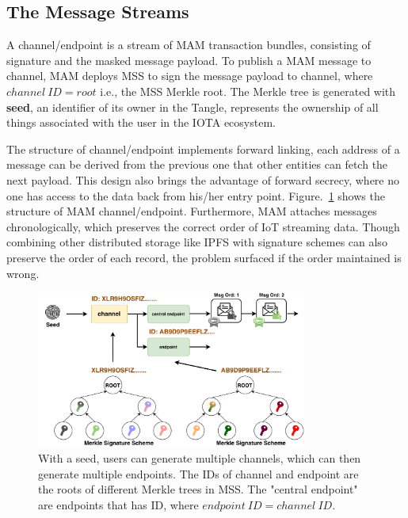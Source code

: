\documentclass[conference]{IEEEtran}
\begin{document}
\subsection{The Message Streams}
\label{section:mam_streams}
A channel/endpoint is a stream of MAM transaction bundles, consisting of signature and the masked message payload. To publish a MAM message to channel, MAM deploys MSS to sign the message payload to channel, where $channel\ ID = root$ i.e., the MSS Merkle root. The Merkle tree is generated with \textbf{seed}, an identifier of its owner in the Tangle, represents the ownership of all things associated with the user in the IOTA ecosystem.

The structure of channel/endpoint implements forward linking, each address of a message can be derived from the previous one that other entities can fetch the next payload. This design also brings the advantage of forward secrecy, where no one has access to the data back from his/her entry point. Figure.~\ref{fig:mam_structure} shows the structure of MAM channel/endpoint. Furthermore, MAM attaches messages chronologically, which preserves the correct order of IoT streaming data. Though combining other distributed storage like IPFS\cite{IPFS} with signature schemes can also preserve the order of each record, the problem surfaced if the order maintained is wrong.

\begin{figure}[h]
    \centering
    \includegraphics[width=3.5in]{mam_structure}
    \caption{With a seed, users can generate multiple channels, which can then generate multiple endpoints. The IDs of channel and endpoint are the roots of different Merkle trees in MSS. The "central endpoint" are endpoints that has ID, where $endpoint\ ID = channel\ ID$.}
    \label{fig:mam_structure}
\end{figure}
\end{document}
